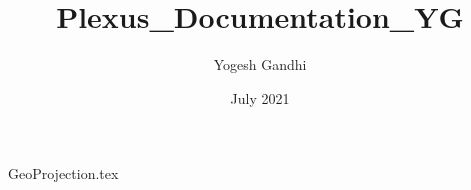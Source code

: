 \documentclass{article}
\title{Plexus_Documentation_YG}
\author{Yogesh Gandhi}
\date{July 2021}
\begin{document}
{GeoProjection.tex}
\end{document}
